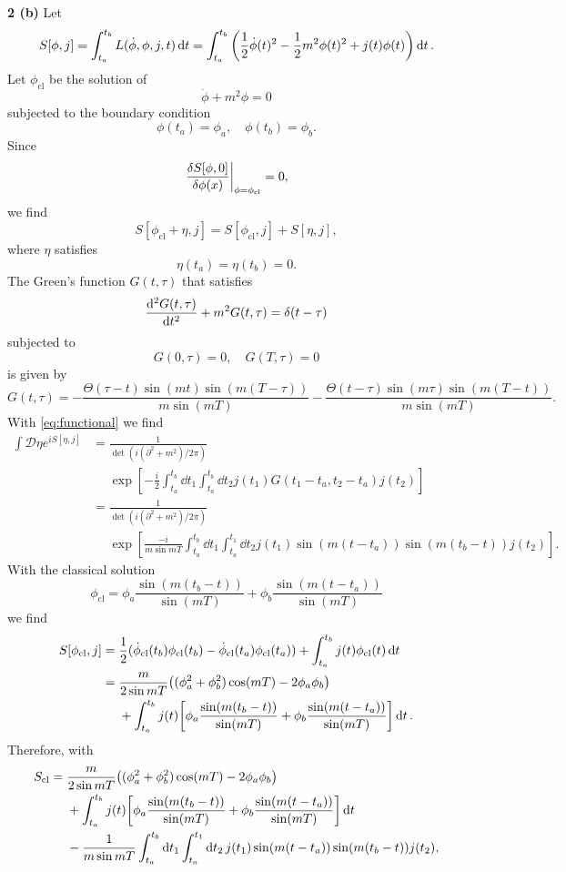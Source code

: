 \documentclass{article}
\makeatletter
\newcommand*{\shifttext}[1]{%
  \settowidth{\@tempdima}{#1}%
  \hspace{-\@tempdima}#1%
}
\newcommand{\plabel}[1]{%
\shifttext{\textbf{#1}\quad}%
}
\makeatother
\begin{document}
\plabel{2 (b)}%
Let
\[ S[\phi,j] = \int_{t_a}^{t_b} L(\dot{\phi},\phi,j,t) \dd{t} = \int_{t_a}^{t_b} \qty(\frac{1}{2}\dot{\phi}(t)^2 - \frac{1}{2}m^2 \phi(t)^2 + j(t)\phi(t)) \dd{t}. \]
Let $\phi_{\mathrm{cl}}$ be the solution of
\[ \ddot{\phi} + m^2 \phi = 0 \]
subjected to the boundary condition
\[ \phi(t_a) = \phi_a,\quad \phi(t_b) = \phi_b. \]
Since
\[ \eval{\frac{\delta S[\phi,0]}{\delta \phi(x)}}_{\phi=\phi_{\mathrm{cl}}} = 0, \]
we find
\[ S[\phi_{\mathrm{cl}} + \eta,j] = S[\phi_{\mathrm{cl}},j] + S[\eta,j], \]
where $\eta$ satisfies
\[ \eta(t_a) = \eta(t_b) = 0. \]
The Green's function $G(t,\tau)$ that satisfies
\[ \dv[2]{G(t,\tau)}{t} + m^2 G(t,\tau) = \delta(t-\tau) \]
subjected to
\[ G(0,\tau) = 0,\quad G(T,\tau) = 0 \]
is given by
\[ G(t,\tau) = -\frac{\Theta(\tau -t) \sin (m t)  \sin (m (T-\tau ))}{m \sin(mT)}-\frac{\Theta(t-\tau) \sin (m \tau ) \sin (m (T-t))}{m \sin (m T)}. \]
With \cref{eq:functional} we find
\begin{align*}
    \int \mathcal{D}\eta e^{iS[\eta,j]} &= \frac{1}{\det(i(\partial^2 + m^2)/2\pi)} \\
    &{\phantom{{}={}}} \exp[-\frac{i}{2}\int_{t_a}^{t_b} \dd{t_1} \int_{t_a}^{t_b} \dd{t_2} j(t_1) G(t_1 - t_a,t_2 - t_a) j(t_2)] \\
    &= \frac{1}{\det(i(\partial^2 + m^2)/2\pi)} \\
    &\phantom{{}={}} \exp[\frac{-i}{m\sin m T}\int_{t_a}^{t_b} \dd{t_1} \int_{t_a}^{t_1} \dd{t_2} j(t_1) \sin(m(t - t_a))\sin(m(t_b - t)) j(t_2)].
\end{align*}
With the classical solution
\[ \phi_{\mathrm{cl}} = \phi_a\frac{\sin(m(t_b - t))}{\sin (mT)} + \phi_b \frac{\sin(m (t - t_a))}{\sin (mT)} \]
we find
\begin{align*}
    S[\phi_{\mathrm{cl}},j] &= \frac{1}{2}(\dot{\phi}_{\mathrm{cl}}(t_b)\phi_{\mathrm{cl}}(t_b) - \dot{\phi}_{\mathrm{cl}}(t_a)\phi_{\mathrm{cl}}(t_a)) + \int_{t_a}^{t_b} j(t)\phi_{\mathrm{cl}}(t) \dd{t} \\
    &= \frac{m}{2\sin mT}\qty((\phi_a^2 + \phi_b^2) \cos(m T) - 2\phi_a \phi_b) \\
    &{\phantom{{}={}}} {} + \int_{t_a}^{t_b} j(t)\qty[\phi_a\frac{\sin(m(t_b - t))}{\sin (mT)} + \phi_b \frac{\sin(m (t - t_a))}{\sin (mT)}]\dd{t}.
\end{align*}
Therefore, with
\begin{align*}
    S_{\mathrm{cl}} &= \frac{m}{2\sin mT}\qty((\phi_a^2 + \phi_b^2) \cos(m T) - 2\phi_a \phi_b) \\
    &{\phantom{{}={}}} {} + \int_{t_a}^{t_b} j(t)\qty[\phi_a\frac{\sin(m(t_b - t))}{\sin (mT)} + \phi_b \frac{\sin(m (t - t_a))}{\sin (mT)}]\dd{t} \\
    &\phantom{{}={}}{} -\frac{1}{m\sin m T}\int_{t_a}^{t_b} \dd{t_1} \int_{t_a}^{t_1} \dd{t_2} j(t_1) \sin(m(t - t_a))\sin(m(t_b - t)) j(t_2),
\end{align*}
\end{document}
